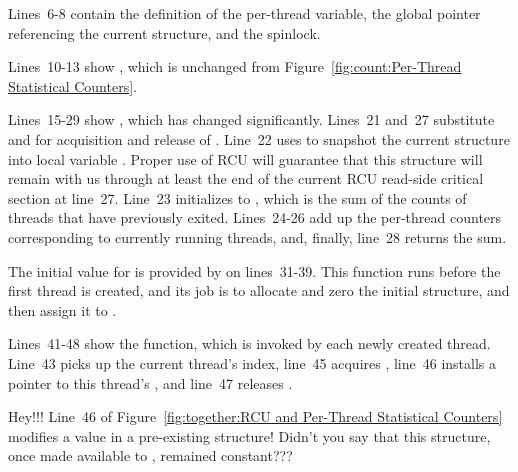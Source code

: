 Lines~6-8 contain the definition of the per-thread 
variable, the global pointer  referencing
the current  structure, and
the  spinlock.

Lines~10-13 show , which is unchanged from
Figure~\ref{fig:count:Per-Thread Statistical Counters}.

Lines~15-29 show , which has changed significantly.
Lines~21 and~27 substitute  and
 for acquisition and release of .
Line~22 uses  to snapshot the
current  structure into local variable .
Proper use of RCU will guarantee that this  structure
will remain with us through at least the end of the current RCU
read-side critical section at line~27.
Line~23 initializes  to , which is the
sum of the counts of threads that have previously exited.
Lines~24-26 add up the per-thread counters corresponding to currently
running threads, and, finally, line~28 returns the sum.

The initial value for  is
provided by  on lines~31-39.
This function runs before the first thread is created, and its job
is to allocate
and zero the initial structure, and then assign it to .

Lines~41-48 show the  function, which
is invoked by each newly created thread.
Line~43 picks up the current thread's index, line~45 acquires
, line~46 installs a pointer to this thread's
, and line~47 releases .

\QuickQuiz{}
	Hey!!!
	Line~46 of
	Figure~\ref{fig:together:RCU and Per-Thread Statistical Counters}
	modifies a value in a pre-existing  structure!
	Didn't you say that this structure, once made available to
	, remained constant???
 \QuickQuizEnd

